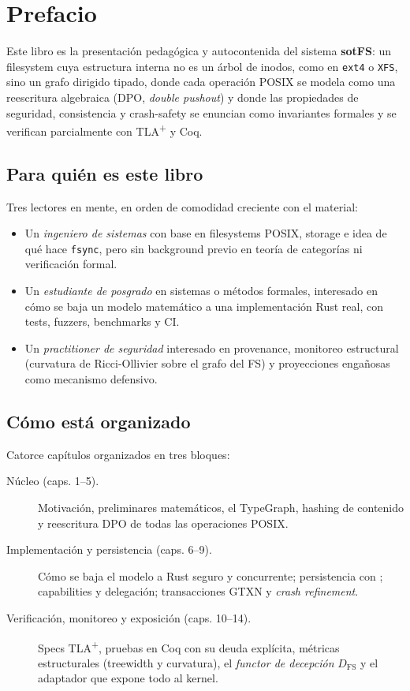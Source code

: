 \chapter*{Prefacio}

Este libro es la presentación pedagógica y autocontenida del sistema
\textbf{sotFS}: un filesystem cuya estructura interna no es un árbol de
inodos, como en \texttt{ext4} o \texttt{XFS}, sino un grafo dirigido
tipado, donde cada operación POSIX se modela como una reescritura algebraica
(DPO, \emph{double pushout}) y donde las propiedades de seguridad,
consistencia y crash-safety se enuncian como invariantes formales y se
verifican parcialmente con TLA\textsuperscript{+} y Coq.

\section*{Para quién es este libro}

Tres lectores en mente, en orden de comodidad creciente con el material:

\begin{itemize}
  \item Un \emph{ingeniero de sistemas} con base en filesystems POSIX,
    storage e idea de qué hace \texttt{fsync}, pero sin background previo
    en teoría de categorías ni verificación formal.
  \item Un \emph{estudiante de posgrado} en sistemas o métodos formales,
    interesado en cómo se baja un modelo matemático a una implementación
    Rust real, con tests, fuzzers, benchmarks y CI.
  \item Un \emph{practitioner de seguridad} interesado en provenance,
    monitoreo estructural (curvatura de Ricci-Ollivier sobre el grafo
    del FS) y proyecciones engañosas como mecanismo defensivo.
\end{itemize}

\section*{Cómo está organizado}

Catorce capítulos organizados en tres bloques:

\begin{description}
  \item[\sffamily Núcleo (caps. 1–5).] Motivación, preliminares
    matemáticos, el TypeGraph, hashing de contenido y reescritura DPO de
    todas las operaciones POSIX.
  \item[\sffamily Implementación y persistencia (caps. 6–9).] Cómo se baja
    el modelo a Rust seguro y concurrente; persistencia con \redb;
    capabilities y delegación; transacciones GTXN y \emph{crash refinement}.
  \item[\sffamily Verificación, monitoreo y exposición (caps. 10–14).]
    Specs TLA\textsuperscript{+}, pruebas en Coq con su deuda explícita,
    métricas estructurales (treewidth y curvatura), el \emph{functor de
    decepción} \(D_{\mathrm{FS}}\) y el adaptador \fuse{} que expone todo
    al kernel.
\end{description}

